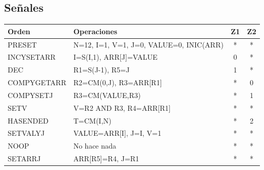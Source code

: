 \documentclass[12pt,a4paper,oneside]{article}
\begin{document}
\subsection{Señales} \label{senales}

\begin{table}[H]
    \begin{tabular}{|l|l|cc|}
    \hline
    Orden       & Operaciones                             & \multicolumn{1}{l}{Z1} & \multicolumn{1}{l|}{Z2}  \\ \hline
    PRESET      & N=12, I=1, V=1, J=0, VALUE=0, INIC(ARR) & *                       & *                      \\ \cline{1-2} \hline
    INCYSETARR  & I=S(I,1), ARR{[}J{]}=VALUE              & 0                       & *                      \\ \cline{1-2} \hline
    DEC         & R1=S(J-1), R5=J                         & 1                       & *                      \\ \cline{1-2} \hline
    COMPYGETARR & R2=CM(0,J), R3=ARR{[}R1{]}              & *                       & 0                      \\ \cline{1-2} \hline
    COMPYSETJ   & R3=CM(VALUE,R3)                         & *                       & 1                      \\ \cline{1-2} \hline
    SETV        & V=R2 AND R3, R4=ARR{[}R1{]}             & *                       & *                      \\ \cline{1-2} \hline
    HASENDED    & T=CM(I,N)                               & *                       & 2                      \\ \cline{1-2} \hline
    SETVALYJ    & VALUE=ARR{[}I{]}, J=I, V=1              & *                       & *                      \\ \cline{1-2} \hline
    NOOP        & No hace nada                            & *                       & *                      \\ \cline{1-2} \hline
    SETARRJ     & ARR{[}R5{]}=R4, J=R1                    & *                       & *                      \\ \cline{1-2} \hline
    \end{tabular}
\end{table}
\end{document}
